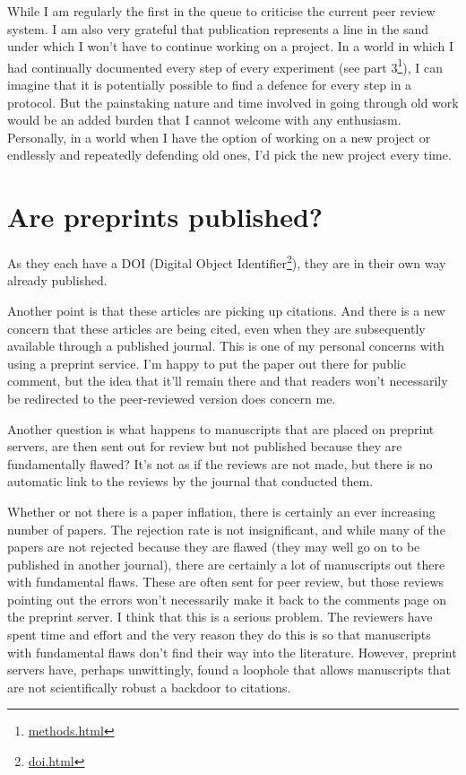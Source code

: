 \documentclass[
]{krantz}
\renewcommand{\href}[2]{#2\footnote{\url{#1}}}
\begin{document}
While I am regularly the first in the queue to criticise the current peer review system. I am also very grateful that publication represents a line in the sand under which I won't have to continue working on a project. In a world in which I had continually documented every step of every experiment (\href{methods.html}{see part 3}), I can imagine that it is potentially possible to find a defence for every step in a protocol. But the painstaking nature and time involved in going through old work would be an added burden that I cannot welcome with any enthusiasm. Personally, in a world when I have the option of working on a new project or endlessly and repeatedly defending old ones, I'd pick the new project every time.

\hypertarget{are-preprints-published}{%
\section{Are preprints published?}\label{are-preprints-published}}

As they each have a DOI (\href{doi.html}{Digital Object Identifier}), they are in their own way already published.

Another point is that these articles are picking up citations. And there is a new concern that these articles are being cited, even when they are subsequently available through a published journal. This is one of my personal concerns with using a preprint service. I'm happy to put the paper out there for public comment, but the idea that it'll remain there and that readers won't necessarily be redirected to the peer-reviewed version does concern me.

Another question is what happens to manuscripts that are placed on preprint servers, are then sent out for review but not published because they are fundamentally flawed? It's not as if the reviews are not made, but there is no automatic link to the reviews by the journal that conducted them.

Whether or not there is a paper inflation, there is certainly an ever increasing number of papers. The rejection rate is not insignificant, and while many of the papers are not rejected because they are flawed (they may well go on to be published in another journal), there are certainly a lot of manuscripts out there with fundamental flaws. These are often sent for peer review, but those reviews pointing out the errors won't necessarily make it back to the comments page on the preprint server. I think that this is a serious problem. The reviewers have spent time and effort and the very reason they do this is so that manuscripts with fundamental flaws don't find their way into the literature. However, preprint servers have, perhaps unwittingly, found a loophole that allows manuscripts that are not scientifically robust a backdoor to citations.
\end{document}
